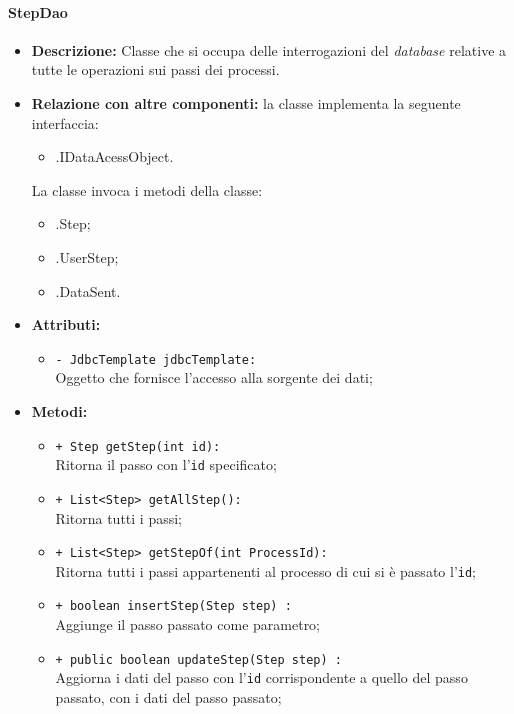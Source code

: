 \paragraph{StepDao}
\label{stepdao}
\begin{flushleft}
\begin{itemize}
\item \textbf{Descrizione:} Classe che si occupa delle interrogazioni del \textit{database} relative a tutte le operazioni sui passi dei processi.
\item \textbf{Relazione con altre componenti:} la classe implementa la seguente interfaccia:
		\begin{itemize}
			\item \smodel{}.IDataAcessObject.
		\end{itemize}
		La classe invoca i metodi della classe:
		\begin{itemize}
			\item \smodel{}.Step;
			\item \smodel{}.UserStep;
			\item \smodel{}.DataSent.
		\end{itemize}
\item \textbf{Attributi:}
\begin{sloppypar}
\begin{itemize}
\item \texttt{- JdbcTemplate jdbcTemplate:}\\ Oggetto che fornisce l'accesso alla sorgente dei dati;
\end{itemize}
\end{sloppypar}
\item \textbf{Metodi:}
\begin{sloppypar}
\begin{itemize}
\item \texttt{+ Step getStep(int id):}\\ Ritorna il passo con l'\texttt{id} specificato; 
\item \texttt{+ List<Step> getAllStep():}\\ Ritorna tutti i passi;
\item \texttt{+ List<Step> getStepOf(int ProcessId):}\\ Ritorna tutti i passi appartenenti al processo di cui si è passato l'\texttt{id};
\item \texttt{+ boolean insertStep(Step step) :}\\ Aggiunge il passo passato come parametro;
\item \texttt{+ public boolean updateStep(Step step) :}\\ Aggiorna i dati del passo con l'\texttt{id} corrispondente a quello del passo passato, con i dati del passo passato;

\end{itemize}
\end{sloppypar}
\end{itemize}
\end{flushleft}
